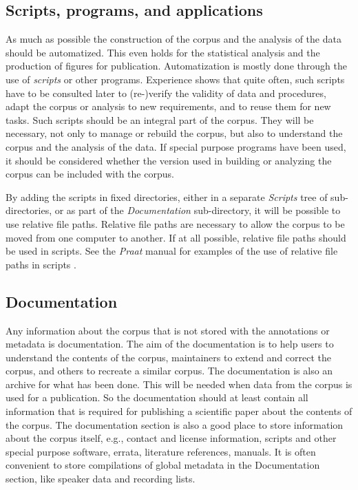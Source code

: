 \documentclass[10pt, a4paper]{article}
\begin{document}
\subsection{Scripts, programs, and applications}

As much as possible the construction of the corpus and the analysis of the data should be automatized. This even holds for the statistical analysis and the production of figures for publication. Automatization is mostly done through the use of \emph{scripts} or other programs. Experience shows that quite often, such scripts have to be consulted later to (re-)verify the validity of data and procedures, adapt the corpus or analysis to new requirements, and to reuse them for new tasks. Such scripts should be an integral part of the corpus. They will be necessary, not only to manage or rebuild the corpus, but also to understand the corpus and the analysis of the data. If special purpose programs have been used, it should be considered whether the version used in building or analyzing the corpus can be included with the corpus. 

By adding the scripts in fixed directories, either in a separate \emph{Scripts} tree of sub-directories, or as part of the  \emph{Documentation} sub-directory, it will be possible to use relative file paths. Relative file paths are necessary to allow the corpus to be moved from one computer to another. If at all possible, relative file paths should be used in scripts. See the \emph{Praat} manual for examples of the use of relative file paths in scripts \cite{PraatFiles13}.

\subsection{Documentation}

Any information about the corpus that is not stored with the annotations or metadata is documentation. The aim of the documentation is to help users to understand the contents of the corpus, maintainers to extend and correct the corpus, and others to recreate a similar corpus. The documentation is also an archive for what has been done. This will be needed when data from the corpus is used for a publication. So the documentation should at least contain all information that is required for publishing a scientific paper about the contents of the corpus. The documentation section is also a good place to store information about the corpus itself, e.g., contact and license information, scripts and other special purpose software, errata, literature references, manuals. It is often convenient to store compilations of global metadata in the Documentation section, like speaker data and recording lists.
\end{document}
